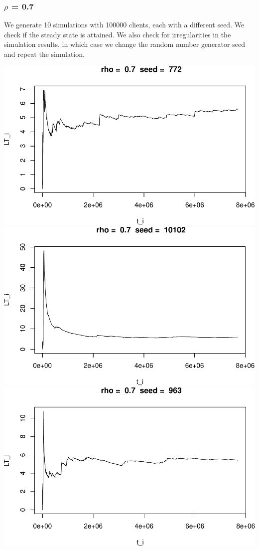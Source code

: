 \documentclass[]{article}
\begin{document}
\subsubsection{\texorpdfstring{\(\rho\) =
0.7}{\textbackslash{}rho = 0.7}}\label{rho-0.7}

We generate 10 simulations with 100000 clients, each with a different
seed. We check if the steady state is attained. We also check for
irregularities in the simulation results, in which case we change the
random number generator seed and repeat the simulation.

\includegraphics{003_files/figure-latex/unnamed-chunk-16-1.pdf}
\includegraphics{003_files/figure-latex/unnamed-chunk-16-2.pdf}
\includegraphics{003_files/figure-latex/unnamed-chunk-16-3.pdf}
\end{document}
